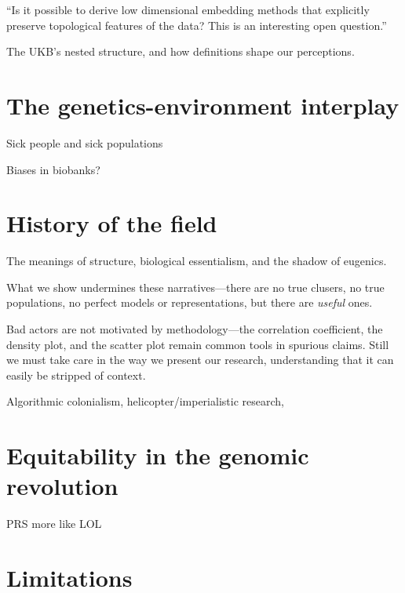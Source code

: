 ``Is it possible to derive low dimensional embedding methods that explicitly preserve topological features of the data? This is an interesting open question.''\citep{wasserman_topological_2018}

The UKB's nested structure, and how definitions shape our perceptions.

\section{The genetics-environment interplay}

Sick people and sick populations\citep{rose_sick_2001}

Biases in biobanks?

\section{History of the field}

The meanings of structure, biological essentialism, and the shadow of eugenics.

What we show undermines these narratives---there are no true clusers, no true populations, no perfect models or representations, but there are \textit{useful} ones.

Bad actors are not motivated by methodology---the correlation coefficient, the density plot, and the scatter plot remain common tools in spurious claims. Still we must take care in the way we present our research, understanding that it can easily be stripped of context.

Algorithmic colonialism, helicopter/imperialistic research, 

\section{Equitability in the genomic revolution}

PRS more like LOL\citep{kaplan_polygenic_2022}

\section{Limitations}

